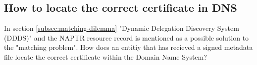 \subsection{How to locate the correct certificate in DNS}
In section \ref{subsec:matching-dilemma} "Dynamic Delegation Discovery System (DDDS)"\cite{rfc:3401,rfc:3402,rfc:3403,rfc:3404} and the NAPTR resource record\cite{rfc:3403} is mentioned as a possible solution to the "matching problem".
How does an entitiy that has recieved a signed metadata file locate the correct certificate within the Domain Name System?


